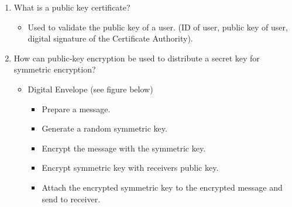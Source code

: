 \documentclass[12pt]{article}
\begin{document}
\begin{enumerate}[label=Q2.\arabic*]
\begin{itemize}
			\end{itemize}
		\item What is a public key certificate?
			\begin{itemize}
				\item Used to validate the public key of a user. (ID of user, public key of user, digital signature of the Certificate Authority).
			\end{itemize}
		\item How can public-key encryption be used to distribute a secret key for symmetric encryption?
			\begin{itemize}
				\item Digital Envelope (see figure below)
					\begin{itemize}
						\item Prepare a message.
						\item Generate a random symmetric key.
						\item Encrypt the message with the symmetric key.
						\item Encrypt symmetric key with receivers public key.
						\item Attach the encrypted symmetric key to the encrypted message and send to receiver.
					\end{itemize}
			\end{itemize}
	\end{enumerate}
\end{document}
